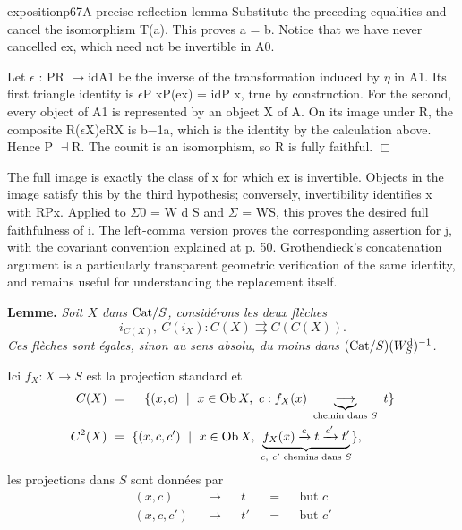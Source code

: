 \begin{dcomment}{exposition}{p67}{A precise reflection lemma}
Substitute the preceding equalities and cancel the isomorphism T(a). This proves a = b. Notice that we have never cancelled ex, which need not be invertible in A0.

Let \ensuremath{\epsilon} : PR \ensuremath{\to}idA1 be the inverse of the transformation induced by \ensuremath{\eta} in A1. Its first triangle identity is \ensuremath{\epsilon}P xP(ex) = idP x, true by construction. For the second, every object of A1 is represented by an object X of A. On its image under R, the composite R(\ensuremath{\epsilon}X)eRX is b\ensuremath{-}1a, which is the identity by the calculation above. Hence P \ensuremath{\dashv}R. The counit is an isomorphism, so R is fully faithful. \ensuremath{\Box}

The full image is exactly the class of x for which ex is invertible. Objects in the image satisfy this by the third hypothesis; conversely, invertibility identifies x with RPx. Applied to \ensuremath{\Sigma}0 = W d S and \ensuremath{\Sigma} = WS, this proves the desired full faithfulness of i. The left-comma version proves the corresponding assertion for j, with the covariant convention explained at p. 50. Grothendieck’s concatenation argument is a particularly transparent geometric verification of the same identity, and remains useful for understanding the replacement itself.

\end{dcomment}


\textbf{Lemme.} \textit{Soit $X$ dans $\mathrm{Cat}/S$, considérons les deux flèches}
\[
i_{C(X)},\ C(i_X):C(X)\rightrightarrows C(C(X)).
\]
\textit{Ces flèches sont égales, sinon au sens absolu, du moins dans $(\mathrm{Cat}/S)(W_S^{\mathrm{d}})^{-1}$.}

Ici $f_X:X\longrightarrow S$ est la projection standard et
\[
\begin{aligned}
C(X)\ &=\ \quad\{(x,c)\ \mid\ x\in\Ob\,X,\ c:f_X(x)\ \underbrace{\longrightarrow}_{\text{chemin dans }S}\ t\}\\
C^2(X)\ &=\ \{(x,c,c')\ \mid\ x\in\Ob\,X,\ \underbrace{f_X(x)\xrightarrow{c}t\xrightarrow{c'}t'}_{c,\ c'\text{ chemins dans }S}\},
\end{aligned}
\]
les projections dans $S$ sont données par
\[
\begin{aligned}
(x,c)&&\longmapsto&&t&&=&&\text{but }c\\
(x,c,c')&&\longmapsto&&t'&&=&&\text{but }c'
\end{aligned}
\]

